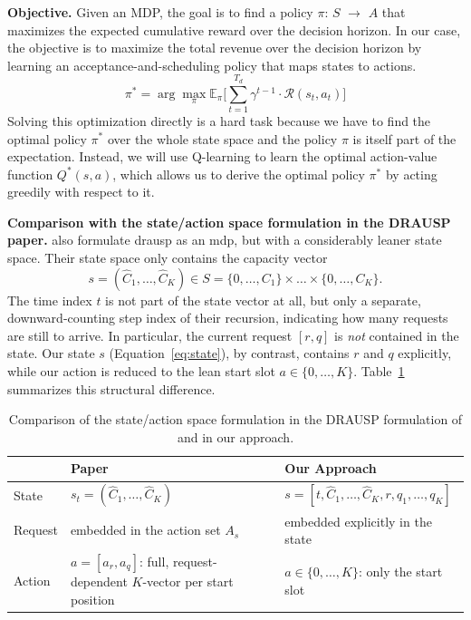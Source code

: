 \textbf{Objective.} 
Given an MDP, the goal is to find a policy $\pi$: $S$ $\to$ $A$ that maximizes the expected cumulative reward over the decision horizon. In our case, the objective is to maximize the total revenue over the decision horizon by learning an acceptance-and-scheduling policy that maps states to actions.
\begin{equation*}
      \pi^* =\arg\max_{\pi} \mathbb{E}_{\pi}\Bigg[\sum_{t=1}^{T_d} \gamma^{t-1} \cdot \mathcal{R}(s_t, a_t)\Bigg]
  \end{equation*}
Solving this optimization directly is a hard task because we have to find the optimal policy $\pi^*$ over the whole state space and the policy $\pi$ is itself part of the expectation. Instead, we will use Q-learning to learn the optimal action-value function $Q^*(s,a)$, which allows us to derive the optimal policy $\pi^*$ by acting greedily with respect to it.

\textbf{Comparison with the state/action space formulation in the DRAUSP paper.}
\textcite{drausp_lion18} also formulate \acs{drausp} as an \acs{mdp}, but with a considerably
leaner state space. Their state space only contains the capacity vector
$$s = (\hat C_1,\dots,\hat C_K) \in S = \{0,\dots,C_1\}\times\dots\times\{0,\dots,C_K\}.$$ The
time index $t$ is not part of the state vector at all, but only a separate, downward-counting step
index of their recursion, indicating how many requests are still to arrive. In particular, the
current request $[r,q]$ is \emph{not} contained in the state. Our state $s$ (Equation~\eqref{eq:state}), by contrast, contains $r$ and $q$
explicitly, while our action is reduced to the lean start slot $a \in \{0,\dots,K\}$.
Table~\ref{tab:mdp-comparison} summarizes this structural difference.

\begin{table}[htbp]
  \centering
  \begin{tabular}{p{}p{}p{}}
    \toprule
     & \textbf{Paper} & \textbf{Our Approach} \\
    \midrule
    State    & $s_t = (\hat C_1,\dots,\hat C_K)$
             & $s = [t,\hat C_1,\dots,\hat C_K,r,q_1,\dots,q_K]$ \\
    Request  & embedded in the action set $A_s$
             & embedded explicitly in the state \\
    Action   & $a=[a_r,a_q]$: full, request-dependent $K$-vector per start position
             & $a \in \{0,\dots,K\}$: only the start slot \\
    \bottomrule
  \end{tabular}
  \caption[State/action space: \textcite{drausp_lion18} vs.\ our approach]{Comparison of the state/action space formulation in the DRAUSP formulation of \textcite{drausp_lion18} and in our approach.}
  \label{tab:mdp-comparison}
\end{table}

